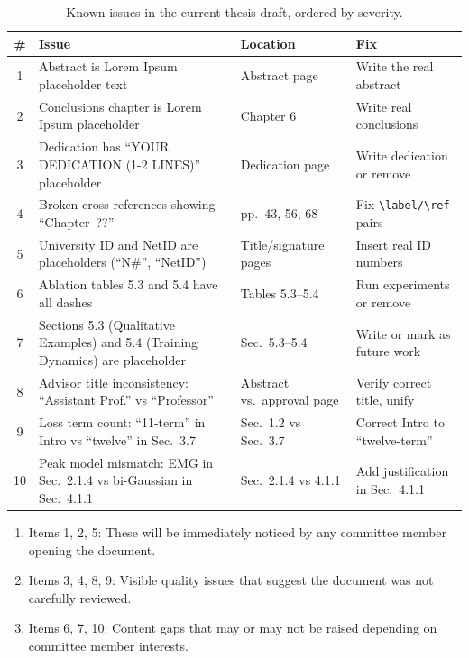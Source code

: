 \documentclass[11pt, letterpaper]{article}
\begin{document}
\renewcommand{\arraystretch}{1.4}
\begin{table}[h!]
\centering
\small
\begin{tabular}{@{} c p{5.8cm} p{3cm} p{3.5cm} @{}}
\toprule
\textbf{\#} & \textbf{Issue} & \textbf{Location} & \textbf{Fix} \\
\midrule
1 & Abstract is Lorem Ipsum placeholder text &
    Abstract page &
    Write the real abstract \\
2 & Conclusions chapter is Lorem Ipsum placeholder &
    Chapter 6 &
    Write real conclusions \\
3 & Dedication has ``YOUR DEDICATION (1-2 LINES)'' placeholder &
    Dedication page &
    Write dedication or remove \\
4 & Broken cross-references showing ``Chapter~??'' &
    pp.\ 43, 56, 68 &
    Fix \verb|\label/\ref| pairs \\
5 & University ID and NetID are placeholders (``N\#'', ``NetID'') &
    Title/signature pages &
    Insert real ID numbers \\
6 & Ablation tables 5.3 and 5.4 have all dashes &
    Tables 5.3--5.4 &
    Run experiments or remove \\
7 & Sections 5.3 (Qualitative Examples) and 5.4 (Training Dynamics) are placeholder &
    Sec.\ 5.3--5.4 &
    Write or mark as future work \\
8 & Advisor title inconsistency: ``Assistant Prof.'' vs ``Professor'' &
    Abstract vs.\ approval page &
    Verify correct title, unify \\
9 & Loss term count: ``11-term'' in Intro vs ``twelve'' in Sec.\ 3.7 &
    Sec.\ 1.2 vs Sec.\ 3.7 &
    Correct Intro to ``twelve-term'' \\
10 & Peak model mismatch: EMG in Sec.\ 2.1.4 vs bi-Gaussian in Sec.\ 4.1.1 &
     Sec.\ 2.1.4 vs 4.1.1 &
     Add justification in Sec.\ 4.1.1 \\
\bottomrule
\end{tabular}
\caption{Known issues in the current thesis draft, ordered by severity.}
\label{tab:issues}
\end{table}

\vspace{1em}

\begin{warnbox}
\begin{enumerate}[nosep]
  \item[\textbf{P0}] Items 1, 2, 5: These will be immediately noticed by any
        committee member opening the document.
  \item[\textbf{P1}] Items 3, 4, 8, 9: Visible quality issues that suggest
        the document was not carefully reviewed.
  \item[\textbf{P2}] Items 6, 7, 10: Content gaps that may or may not be
        raised depending on committee member interests.
\end{enumerate}
\end{warnbox}
\end{document}
